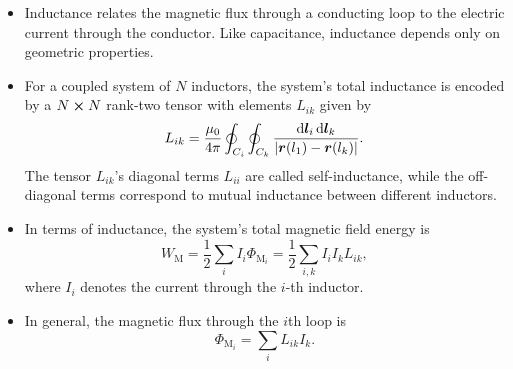 \documentclass[11pt, a4paper]{article}
\newcommand{\diff}{\mathop{}\!\mathrm{d}} %
\renewcommand{\vec}[1]{\bm{#1}} %
\renewcommand{\r}{\vec{r}}
\newcommand{\mm}{\mu_{0}}  %
\begin{document}
\begin{itemize}

	\item Inductance relates the magnetic flux through a conducting loop to the electric current through the conductor. Like capacitance, inductance depends only on geometric properties.

    \item For a coupled system of $ N $ inductors, the system's total inductance is encoded by a $ N \cross N $ rank-two tensor with elements $ L_{ik} $ given by
	\begin{equation*}
		L_{ik} = \frac{\mm}{4\pi}\oint_{C_{i}}\oint_{C_{k}}\frac{\diff \vec{l}_{i}\diff \vec{l}_{k}}{\abs{\r(l_{1}) - \r(l_{k})}}.
	\end{equation*}
    The tensor $ L_{ik} $'s diagonal terms $ L_{ii} $ are called self-inductance, while the off-diagonal terms correspond to mutual inductance between different inductors.

    \item In terms of inductance, the system's total magnetic field energy is
	\begin{equation*}
        W_{\text{M}} = \frac{1}{2}\sum_{i}I_{i}\Phi_{\text{M}_{i}} = \frac{1}{2} \sum_{i, k}I_{i}I_{k} L_{ik},
	\end{equation*}
    where $ I_{i} $ denotes the current through the $ i $-th inductor.
	
    \item In general, the magnetic flux through the $ i $th loop is
    \begin{equation*}
        \Phi_{\text{M}_{i}} = \sum_{i} L_{ik}I_{k}.
    \end{equation*}
	
\end{itemize}
\end{document}
